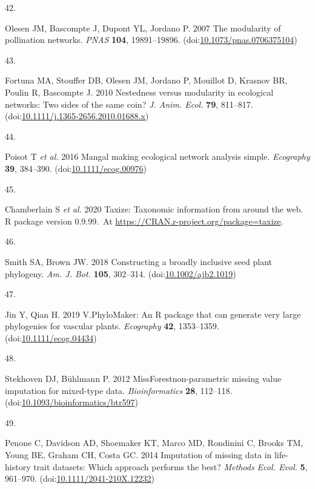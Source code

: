 \documentclass[
  12pt,
  a4paper,
]{article}
\newlength{\cslhangindent}
\newlength{\csllabelwidth}
\newlength{\cslentryspacingunit} %
\newenvironment{CSLReferences}[2] %
 {%
  \setlength{\parindent}{0pt}
  \ifodd #1
  \let\oldpar\par
  \def\par{\hangindent=\cslhangindent\oldpar}
  \fi
  \setlength{\parskip}{#2\cslentryspacingunit}
 }%
 {}
\newcommand{\CSLLeftMargin}[1]{\parbox[t]{\csllabelwidth}{#1}}
\newcommand{\CSLRightInline}[1]{\parbox[t]{\linewidth - \csllabelwidth}{#1}\break}
\begin{document}
\begin{CSLReferences}{0}{0}
\leavevmode{}%
\CSLLeftMargin{42. }
\CSLRightInline{Olesen JM, Bascompte J, Dupont YL, Jordano P. 2007 The modularity of pollination networks. \emph{PNAS} \textbf{104}, 19891--19896. (doi:\href{https://doi.org/10.1073/pnas.0706375104}{10.1073/pnas.0706375104})}

\leavevmode{}%
\CSLLeftMargin{43. }
\CSLRightInline{Fortuna MA, Stouffer DB, Olesen JM, Jordano P, Mouillot D, Krasnov BR, Poulin R, Bascompte J. 2010 Nestedness versus modularity in ecological networks: Two sides of the same coin? \emph{J. Anim. Ecol.} \textbf{79}, 811--817. (doi:\href{https://doi.org/10.1111/j.1365-2656.2010.01688.x}{10.1111/j.1365-2656.2010.01688.x})}

\leavevmode{}%
\CSLLeftMargin{44. }
\CSLRightInline{Poisot T \emph{et al.} 2016 Mangal \textendash{} making ecological network analysis simple. \emph{Ecography} \textbf{39}, 384--390. (doi:\href{https://doi.org/10.1111/ecog.00976}{10.1111/ecog.00976})}

\leavevmode{}%
\CSLLeftMargin{45. }
\CSLRightInline{Chamberlain S \emph{et al.} 2020 Taxize: {Taxonomic} information from around the web. R package version 0.9.99.~At \href{https://CRAN.R-project.org/package=taxize}{https://CRAN.r-project.org/package=taxize}. }

\leavevmode{}%
\CSLLeftMargin{46. }
\CSLRightInline{Smith SA, Brown JW. 2018 Constructing a broadly inclusive seed plant phylogeny. \emph{Am. J. Bot.} \textbf{105}, 302--314. (doi:\href{https://doi.org/10.1002/ajb2.1019}{10.1002/ajb2.1019})}

\leavevmode{}%
\CSLLeftMargin{47. }
\CSLRightInline{Jin Y, Qian H. 2019 V.{PhyloMaker}: An {R} package that can generate very large phylogenies for vascular plants. \emph{Ecography} \textbf{42}, 1353--1359. (doi:\href{https://doi.org/10.1111/ecog.04434}{10.1111/ecog.04434})}

\leavevmode{}%
\CSLLeftMargin{48. }
\CSLRightInline{Stekhoven DJ, Bühlmann P. 2012 {MissForest}\textemdash non-parametric missing value imputation for mixed-type data. \emph{Bioinformatics} \textbf{28}, 112--118. (doi:\href{https://doi.org/10.1093/bioinformatics/btr597}{10.1093/bioinformatics/btr597})}

\leavevmode{}%
\CSLLeftMargin{49. }
\CSLRightInline{Penone C, Davidson AD, Shoemaker KT, Marco MD, Rondinini C, Brooks TM, Young BE, Graham CH, Costa GC. 2014 Imputation of missing data in life-history trait datasets: Which approach performs the best? \emph{Methods Ecol. Evol.} \textbf{5}, 961--970. (doi:\href{https://doi.org/10.1111/2041-210X.12232}{10.1111/2041-210X.12232})}


\end{CSLReferences}
\end{document}
